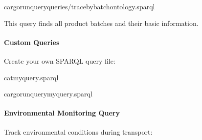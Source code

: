 \documentclass[letterpaper,10pt,english]{sphinxmanual}
\begin{document}
\begin{sphinxVerbatim}[commandchars=\\\{\}]
cargorun\PYGZhy{}\PYGZhy{}queryqueries/trace\PYGZus{}by\PYGZus{}batch\PYGZus{}ontology.sparql
\end{sphinxVerbatim}

\sphinxAtStartPar
This query finds all product batches and their basic information.


\paragraph{Custom Queries}
\label{\detokenize{tutorials/first-supply-chain:custom-queries}}
\sphinxAtStartPar
Create your own SPARQL query file:

\begin{sphinxVerbatim}[commandchars=\\\{\}]
cat\PYGZgt{}my\PYGZus{}query.sparql


cargorun\PYGZhy{}\PYGZhy{}querymy\PYGZus{}query.sparql
\end{sphinxVerbatim}


\paragraph{Environmental Monitoring Query}
\label{\detokenize{tutorials/first-supply-chain:environmental-monitoring-query}}
\sphinxAtStartPar
Track environmental conditions during transport:
\end{document}
